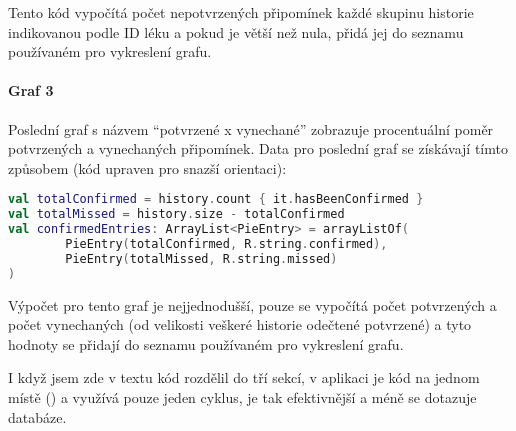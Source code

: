 \documentclass[../TakeYourPill.tex]{subfiles}
\begin{document}
Tento kód vypočítá počet nepotvrzených připomínek každé skupinu historie indikovanou podle ID léku a pokud je větší než nula, přidá jej do seznamu používaném pro vykreslení grafu.


\paragraph{Graf 3} Poslední graf s názvem \enquote{potvrzené x vynechané} zobrazuje procentuální poměr potvrzených a vynechaných připomínek. Data pro poslední graf se získávají tímto způsobem (kód upraven pro snazší orientaci):

\begin{lstlisting}[language=Kotlin]
val totalConfirmed = history.count { it.hasBeenConfirmed }
val totalMissed = history.size - totalConfirmed
val confirmedEntries: ArrayList<PieEntry> = arrayListOf(
        PieEntry(totalConfirmed, R.string.confirmed),
        PieEntry(totalMissed, R.string.missed)
)
\end{lstlisting}

Výpočet pro tento graf je nejjednodušší, pouze se vypočítá počet potvrzených a počet vynechaných (od velikosti veškeré historie odečtené potvrzené) a tyto hodnoty se přidají do seznamu používaném pro vykreslení grafu.

I když jsem zde v textu kód rozdělil do tří sekcí, v aplikaci je kód na jednom místě () a využívá pouze jeden cyklus, je tak efektivnější a méně se dotazuje databáze.
\end{document}
